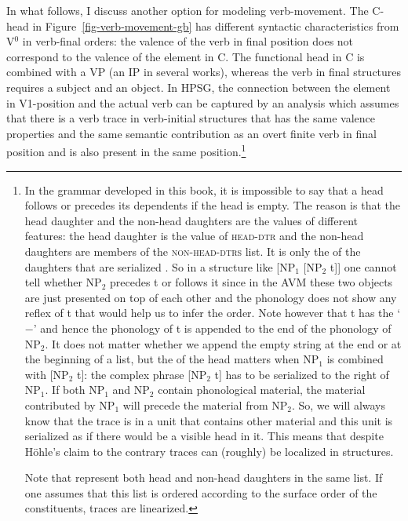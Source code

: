 {In what follows, I discuss another option for modeling verb-movement.
The C-head in Figure~\ref{fig-verb-movement-gb} has different syntactic characteristics from
V$^0$ in verb-final orders: the valence of the verb in final position does not correspond to
the valence of the element in C. The functional head in C is combined with a VP (an IP in several
works), whereas the verb in final structures requires a subject and an object. 
In HPSG, the connection between the element in V1-position and the actual verb can be captured by an analysis which
assumes that there is a verb trace in verb-initial structures that has the same valence properties and the same semantic
contribution as an overt finite verb in final position and is also present in the same
position.\footnote{
  In the grammar developed in this book, it is impossible to say that a head follows or precedes its
  dependents if the head is empty. The reason is that the head daughter and the non-head daughters
  are the values of different features: the head daughter is the value of \textsc{head-dtr} and the
  non-head daughters are members of the \textsc{non-head-dtrs} list. It is only the \phonvs of the
  daughters that are serialized \citep{Hoehle94a}. So in a structure like [NP$_1$ [NP$_2$ t]] one cannot tell whether
  NP$_2$ precedes t or follows it since in the AVM these two objects are just presented on top of each
  other and the phonology does not show any reflex of t that would help us to infer the order. Note
  however that t has the \initialv `$-$' and hence the phonology of t is appended to the end of the
  phonology of NP$_2$. It does not matter whether we append the empty string at the end or at the
  beginning of a list, but the \initialv of the head matters when NP$_1$ is combined with [NP$_2$ t]:
  the complex phrase [NP$_2$ t] has to be serialized to the right of NP$_1$. If both NP$_1$ and
  NP$_2$ contain phonological material, the material contributed by NP$_1$ will precede the material
  from NP$_2$. So, we will always know that the trace is in a unit that contains other material and
  this unit is serialized as if there would be a visible head in it. This means that despite Höhle's
  claim to the contrary traces can (roughly) be localized in structures.

  Note that \citet{GSag2000a-u} represent both head and non-head daughters in the same list. If one
  assumes that this list is ordered according to the surface order of the constituents, traces are
  linearized.

}}
